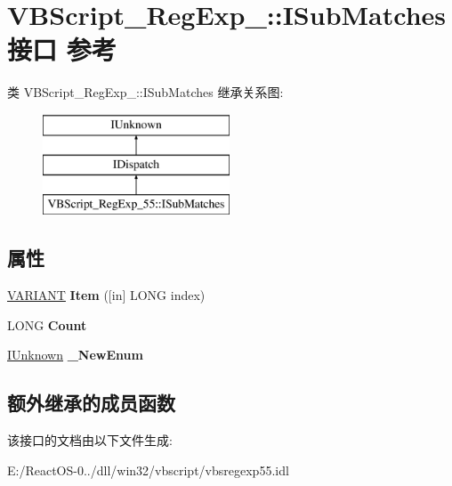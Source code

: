 \hypertarget{interface_v_b_script___reg_exp__55_1_1_i_sub_matches}{}\section{V\+B\+Script\+\_\+\+Reg\+Exp\+\_\+:\+:I\+Sub\+Matches接口 参考}
\label{interface_v_b_script___reg_exp__55_1_1_i_sub_matches}
类 V\+B\+Script\+\_\+\+Reg\+Exp\+\_\+:\+:I\+Sub\+Matches 继承关系图\+:\begin{figure}[H]
\begin{center}
\leavevmode
\includegraphics[height=3.000000cm]{interface_v_b_script___reg_exp__55_1_1_i_sub_matches}
\end{center}
\end{figure}
\subsection*{属性}
\begin{DoxyCompactItemize}
\item 
\mbox{\label{interface_v_b_script___reg_exp__55_1_1_i_sub_matches_af50bf249fa83ab28afd0ae6a79be2318}} 
\hyperlink{structtag_v_a_r_i_a_n_t}{V\+A\+R\+I\+A\+NT} {\bfseries Item} (\mbox{[}in\mbox{]} L\+O\+NG index)
\item 
\mbox{\label{interface_v_b_script___reg_exp__55_1_1_i_sub_matches_ae405bdf0249c556fa3f3eb1f232e194d}} 
L\+O\+NG {\bfseries Count}
\item 
\mbox{\label{interface_v_b_script___reg_exp__55_1_1_i_sub_matches_a7e80e74e9cb0ed5223ddfc3ce88c0761}} 
\hyperlink{interface_i_unknown}{I\+Unknown} {\bfseries \+\_\+\+New\+Enum}
\end{DoxyCompactItemize}
\subsection*{额外继承的成员函数}


该接口的文档由以下文件生成\+:\begin{DoxyCompactItemize}
\item 
E\+:/\+React\+O\+S-\/0../dll/win32/vbscript/vbsregexp55.\+idl\end{DoxyCompactItemize}
